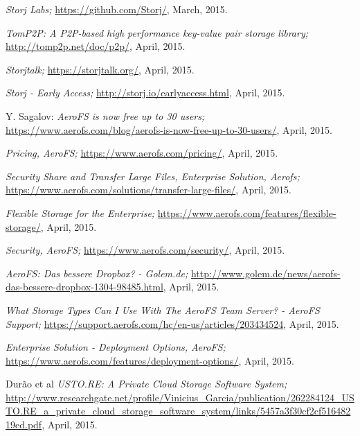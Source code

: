 \begin{thebibliography}{99}
		\emph{Storj Labs;}
		\url{https://github.com/Storj/},
		March, 2015.
		
		\emph{TomP2P: A P2P-based high performance key-value pair storage library;}
		\url{http://tomp2p.net/doc/p2p/},
		April, 2015.
		
		\emph{Storjtalk;}
		\url{https://storjtalk.org/},
		April, 2015.
		
		\emph{Storj - Early Access;}
		\url{http://storj.io/earlyaccess.html},
		April, 2015.
		
		Y. Sagalov:
		\emph{AeroFS is now free up to 30 users;}
		\url{https://www.aerofs.com/blog/aerofs-is-now-free-up-to-30-users/},
		April, 2015.
		
		\emph{Pricing, AeroFS;}
		\url{https://www.aerofs.com/pricing/},
		April, 2015.
		
		\emph{Security Share and Transfer Large Files, Enterprise Solution, Aerofs;}
		\url{https://www.aerofs.com/solutions/transfer-large-files/},
		April, 2015.
		
		\emph{Flexible Storage for the Enterprise;}
		\url{https://www.aerofs.com/features/flexible-storage/},
		April, 2015.
		
		\emph{Security, AeroFS;}
		\url{https://www.aerofs.com/security/},
		April, 2015.
		
		\emph{AeroFS: Das bessere Dropbox? - Golem.de;}
		\url{http://www.golem.de/news/aerofs-das-bessere-dropbox-1304-98485.html},
		April, 2015.
		
		\emph{What Storage Types Can I Use With The AeroFS Team Server? - AeroFS Support;}
		\url{https://support.aerofs.com/hc/en-us/articles/203434524},
		April, 2015.
		
		\emph{Enterprise Solution - Deployment Options, AeroFS;}
		\url{https://www.aerofs.com/features/deployment-options/},
		April, 2015.
		
		Dur\~ao et al
		\emph{USTO.RE: A Private Cloud Storage Software System;}
		\url{http://www.researchgate.net/profile/Vinicius_Garcia/publication/262284124_USTO.RE_a_private_cloud_storage_software_system/links/5457a3f30cf2cf51648219ed.pdf},
		April, 2015.
		
\end{thebibliography}